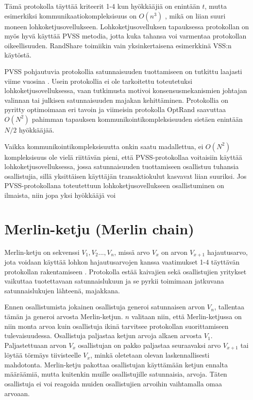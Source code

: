 Tämä protokolla täyttää kriteerit 1-4 kun hyökkääjiä on enintään $t$, mutta esimerkiksi kommunikaatiokompleksisuus on $O(n^3)$ \cite{syta_scalable_2017}, mikä on liian suuri moneen lohkoketjusovellukseen. Lohkoketjusovelluksen tapauksessa protokollan on myös hyvä käyttää PVSS metodia, jotta kuka tahansa voi varmentaa protokollan oikeellisuuden. RandShare toimiikin vain yksinkertaisena esimerkkinä VSS:n käytöstä. 

PVSS pohjautuvia protokollia satunnaisuuden tuottamiseen on tutkittu laajasti viime vuosina \cite{bhat2022optrand}. Usein protokollia ei ole tarkoitettu toteutetuksi lohkoketjusovelluksessa, vaan tutkimusta motivoi konsensusmekanismien johtajan valinnan tai julkisen satunnaisuuden majakan kehittäminen. Protokollia on pyritty optimoimaan eri tavoin ja viimeisin protokolla OptRand saavuttaa $O(N^2)$ pahimman tapauksen kommunikointikompleksisuuden \cite{bhat2022optrand} sietäen enintään $N/2$ hyökkääjää.

Vaikka kommunikointikompleksisuutta onkin saatu madallettua, ei $O(N^2)$ kompleksisuus ole vielä riittävän pieni, että PVSS-protokollaa voitaisiin käyttää lohkoketjusovelluksessa, jossa satunnaisuuden tuottamiseen osallistuu tuhansia osallistujia, sillä yksittäisen käyttäjän transaktiokulut kasvavat liian suuriksi. Jos PVSS-protokollana toteutettuun lohkoketjusovellukseen osallistuminen on ilmaista, niin jopa yksi hyökkääjä voi  %

\section{Merlin-ketju (Merlin chain)}

Merlin-ketju on sekvenssi $V_1, V_2 ... , V_n$, missä arvo $V_x$ on arvon $V_{x+1}$ hajautusarvo, jota voidaan käyttää lohkon hajautusarvojen kanssa vaatimukset 1-4 täyttävän protokollan rakentamiseen \cite{MerlinChains}. Protokolla estää kaivajien sekä osallistujien yritykset vaikuttaa tuotettavaan satunnaislukuun ja se pyrkii toimimaan jatkuvana satunnaislukujen lähteenä, majakkana. 

Ennen osallistumista jokainen osallistuja generoi satunnaisen arvon $V_n$, tallentaa tämän ja generoi arvosta Merlin-ketjun. $n$ valitaan niin, että Merlin-ketjussa on niin monta arvoa kuin osallistuja ikinä tarvitsee protokollan suorittamiseen tulevaisuudessa. Osallistuja paljastaa ketjun arvoja alkaen arvosta $V_1$. Paljastettuaan arvon $V_x$ osallistujan on pakko paljastaa seuraavaksi arvo $V_{x+1}$ tai löytää törmäys tiivisteelle $V_x$, minkä oletetaan olevan laskennallisesti mahdotonta. Merlin-ketju pakottaa osallistujan käyttämään ketjun ennalta määräämiä, mutta kuitenkin muille osallistujille satunnaisia, arvoja. Täten osallistuja ei voi reagoida muiden osallistujien arvoihin vaihtamalla omaa arvoaan.  

